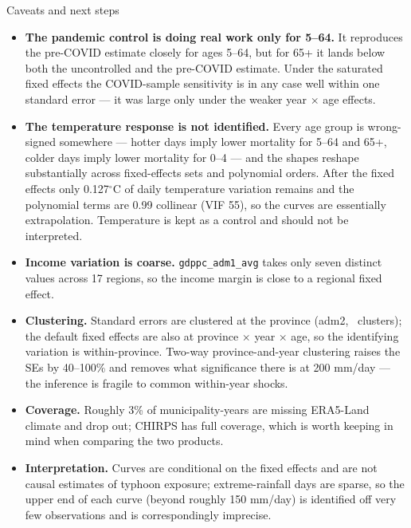 \documentclass[10pt, aspectratio=169]{beamer}
\begin{document}
\begin{frame}{Caveats and next steps}
  \begin{itemize}
    \item \textbf{The pandemic control is doing real work only for 5--64.}
          It reproduces the pre-COVID estimate closely for ages 5--64, but for
          65+ it lands below both the uncontrolled and the pre-COVID estimate.
          Under the saturated fixed effects the COVID-sample sensitivity is in
          any case well within one standard error --- it was large only under
          the weaker year $\times$ age effects.
    \item \textbf{The temperature response is not identified.} Every age group
          is wrong-signed somewhere --- hotter days imply lower mortality for
          5--64 and 65+, colder days imply lower mortality for 0--4 --- and the
          shapes reshape substantially across fixed-effects sets and polynomial
          orders. After the fixed effects only 0.127$^\circ$C of daily
          temperature variation remains and the polynomial terms are 0.99
          collinear (VIF 55), so the curves are essentially extrapolation.
          Temperature is kept as a control and should not be interpreted.
    \item \textbf{Income variation is coarse.} \texttt{gdppc\_adm1\_avg} takes
          only seven distinct values across 17 regions, so the income margin is
          close to a regional fixed effect.
    \item \textbf{Clustering.} Standard errors are clustered at the province
          (adm2, \phlNadmtwo\ clusters); the default fixed effects are also at
          province $\times$ year $\times$ age, so the identifying variation is
          within-province. Two-way province-and-year clustering raises the SEs
          by 40--100\% and removes what significance there is at 200 mm/day
          --- the inference is fragile to common within-year shocks.
    \item \textbf{Coverage.} Roughly 3\% of municipality-years are missing
          ERA5-Land climate and drop out; CHIRPS has full coverage, which is
          worth keeping in mind when comparing the two products.
    \item \textbf{Interpretation.} Curves are conditional on the fixed effects
          and are not causal estimates of typhoon exposure; extreme-rainfall
          days are sparse, so the upper end of each curve (beyond roughly
          150 mm/day) is identified off very few observations and is
          correspondingly imprecise.
  \end{itemize}
\end{frame}
\end{document}

